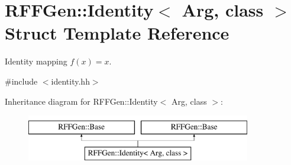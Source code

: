 \hypertarget{structRFFGen_1_1Identity}{\section{R\-F\-F\-Gen\-:\-:Identity$<$ Arg, class $>$ Struct Template Reference}
\label{structRFFGen_1_1Identity}
}


Identity mapping $ f(x)=x $.  




{\ttfamily \#include $<$identity.\-hh$>$}

Inheritance diagram for R\-F\-F\-Gen\-:\-:Identity$<$ Arg, class $>$\-:\begin{figure}[H]
\begin{center}
\leavevmode
\includegraphics[height=2.000000cm]{structRFFGen_1_1Identity}
\end{center}
\end{figure}
